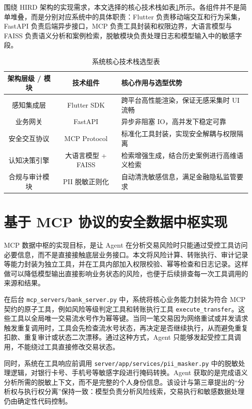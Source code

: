 \documentclass{xduugthesis}
\begin{document}
围绕 HIRD 架构的实现需求，本文选择的核心技术栈如表\ref{tab:tech-stack}所示。各组件并不是简单堆叠，而是分别对应系统中的具体职责：Flutter 负责移动端交互和行为采集，FastAPI 负责后端异步接口，MCP 负责工具封装和权限边界，大语言模型与 FAISS 负责语义分析和案例检索，脱敏模块负责处理日志和模型输入中的敏感字段。

\begin{table}[H]
    \centering
    \caption{系统核心技术栈选型表}
    \label{tab:tech-stack}
    \begin{tabular}{|c|c|p{7cm}|}
        \hline
        架构层级 / 模块 & 技术组件 & 核心作用与选型优势 \\
        \hline
        感知集成层  & Flutter SDK & 跨平台高性能渲染，保证无感采集时 UI 流畅 \\
        \hline
        业务网关  & FastAPI & 异步非阻塞 IO，高并发下稳定可靠 \\
        \hline
        安全交互协议 & MCP Protocol & 标准化工具封装，实现安全解耦与权限隔离 \\
        \hline
        认知决策引擎 & 大语言模型 + FAISS & 检索增强生成，结合历史案例进行高维语义检索 \\
        \hline
        合规与审计模块 & PII 脱敏正则化 & 自动清洗敏感信息，满足金融隐私监管要求 \\
        \hline
    \end{tabular}
\end{table}

\section{基于 MCP 协议的安全数据中枢实现}

MCP 数据中枢的实现目标，是让 Agent 在分析交易风险时只能通过受控工具访问必要信息，而不是直接接触底层业务接口。本文将风险计算、转账执行、审计记录等能力封装为独立工具，并在工具内部加入权限校验、幂等检查和日志记录。这样做可以降低模型输出直接影响业务状态的风险，也便于后续排查每一次工具调用的来源和结果。

在后台 \texttt{mcp\_servers/bank\_server.py} 中，系统将核心业务能力封装为符合 MCP 契约的原子工具，例如风险等级判定工具和转账执行工具 \texttt{execute\_transfer}。这些工具以全局唯一交易流水号作为幂等键。当同一笔交易因为网络重试或并发请求触发重复调用时，工具会先检查流水号状态，再决定是否继续执行，从而避免重复扣款、重复审计或状态二次漂移。通过这种方式，Agent 只能够发起受控工具调用，不能绕过工具直接修改交易状态。

同时，系统在工具响应前调用 \texttt{server/app/services/pii\_masker.py} 中的脱敏处理逻辑，对银行卡号、手机号等敏感字段进行掩码转换。Agent 获取的是完成语义分析所需的脱敏上下文，而不是完整的个人身份信息。该设计与第三章提出的“分析权与执行权分离”保持一致：模型负责分析风险线索，交易执行和敏感数据处理仍由确定性代码控制。
\end{document}
